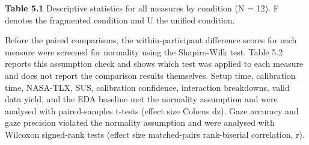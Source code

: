 \documentclass[
]{article}
\begin{document}
%
\textbf{Table 5.1} Descriptive statistics for all measures by condition (N = 12). F denotes the fragmented condition and U the unified condition.

Before the paired comparisons, the within-participant difference scores for each measure were screened for normality using the Shapiro-Wilk test. Table 5.2 reports this assumption check and shows which test was applied to each measure and does not report the comparison results themselves. Setup time, calibration time, NASA-TLX, SUS, calibration confidence, interaction breakdowns, valid data yield, and the EDA baseline met the normality assumption and were analysed with paired-samples t-tests (effect size Cohen\textquotesingle s dz). Gaze accuracy and gaze precision violated the normality assumption and were analysed with Wilcoxon signed-rank tests (effect size matched-pairs rank-biserial correlation, r).
\end{document}
